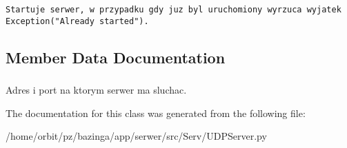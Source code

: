 \footnotesize\begin{verbatim}Startuje serwer, w przypadku gdy juz byl uruchomiony wyrzuca wyjatek Exception("Already started").\end{verbatim}
\normalsize
 

\subsection{Member Data Documentation}
\hypertarget{class_serv_1_1_u_d_p_server_1_1_u_d_p_server_19f6bc70abc4eb1d1c0806a9364d1fbe}{
\subsubsection[{addr}]{}}
\label{class_serv_1_1_u_d_p_server_1_1_u_d_p_server_19f6bc70abc4eb1d1c0806a9364d1fbe}


Adres i port na ktorym serwer ma sluchac. 



The documentation for this class was generated from the following file:\begin{CompactItemize}
\item 
/home/orbit/pz/bazinga/app/serwer/src/Serv/UDPServer.py\end{CompactItemize}
